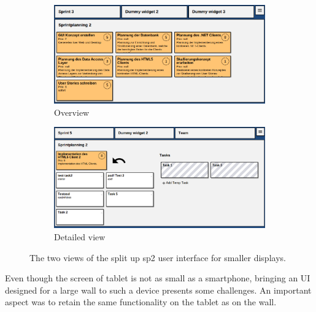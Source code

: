 \documentclass{sigchi}
\begin{document}

\begin{figure}
	\centering
	\begin{subfigure}[b]{1\columnwidth}
		\includegraphics[width=\textwidth]{figures/sp2-overview}
		\caption{Overview}
		\label{fig:sp2-overview}
	\end{subfigure}%
	\quad
	\begin{subfigure}[b]{1\columnwidth}
		\includegraphics[width=\textwidth]{figures/sp2-detail}
		\caption{Detailed view}
		\label{fig:sp2-detail}
	\end{subfigure}
	
	\caption{The two views of the split up \gls{sp2} user interface for smaller displays.}\label{fig:animals}
\end{figure}

Even though the screen of tablet is not as small as a smartphone, bringing an UI designed for a large wall to such a device presents some challenges.
An important aspect was to retain the same functionality on the tablet as on the wall.
\end{document}
